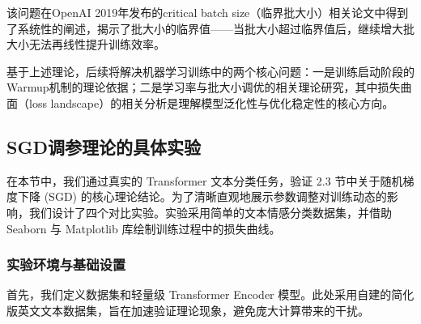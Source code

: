 \documentclass[10pt]{article}
\numberwithin{equation}{section}
\theoremstyle{plain}
\theoremstyle{definition}
\theoremstyle{remark}
\begin{document}
该问题在OpenAI 2019年发布的critical batch size（临界批大小）相关论文中得到了系统性的阐述，揭示了批大小的临界值——当批大小超过临界值后，继续增大批大小无法再线性提升训练效率。

基于上述理论，后续将解决机器学习训练中的两个核心问题：一是训练启动阶段的Warmup机制的理论依据；二是学习率与批大小调优的相关理论研究，其中损失曲面（loss landscape）的相关分析是理解模型泛化性与优化稳定性的核心方向。


\subsection{SGD调参理论的具体实验}
\label{sec:sgd_experiment}

在本节中，我们通过真实的 Transformer 文本分类任务，验证 2.3 节中关于随机梯度下降 (SGD) 的核心理论结论。为了清晰直观地展示参数调整对训练动态的影响，我们设计了四个对比实验。实验采用简单的文本情感分类数据集，并借助 Seaborn 与 Matplotlib 库绘制训练过程中的损失曲线。

\subsubsection{实验环境与基础设置}

首先，我们定义数据集和轻量级 Transformer Encoder 模型。此处采用自建的简化版英文文本数据集，旨在加速验证理论现象，避免庞大计算带来的干扰。
\end{document}
